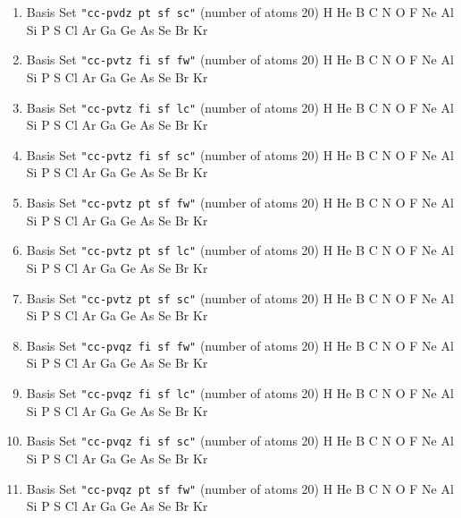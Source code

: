 \begin{enumerate}
\item Basis Set \verb#"cc-pvdz pt sf sc"# (number of atoms 20)  \newline 
  H He B C N O F Ne Al Si P S Cl Ar Ga Ge As Se Br Kr


\item Basis Set \verb#"cc-pvtz fi sf fw"# (number of atoms 20)  \newline 
  H He B C N O F Ne Al Si P S Cl Ar Ga Ge As Se Br Kr


\item Basis Set \verb#"cc-pvtz fi sf lc"# (number of atoms 20)  \newline 
  H He B C N O F Ne Al Si P S Cl Ar Ga Ge As Se Br Kr


\item Basis Set \verb#"cc-pvtz fi sf sc"# (number of atoms 20)  \newline 
  H He B C N O F Ne Al Si P S Cl Ar Ga Ge As Se Br Kr


\item Basis Set \verb#"cc-pvtz pt sf fw"# (number of atoms 20)  \newline 
  H He B C N O F Ne Al Si P S Cl Ar Ga Ge As Se Br Kr


\item Basis Set \verb#"cc-pvtz pt sf lc"# (number of atoms 20)  \newline 
  H He B C N O F Ne Al Si P S Cl Ar Ga Ge As Se Br Kr


\item Basis Set \verb#"cc-pvtz pt sf sc"# (number of atoms 20)  \newline 
  H He B C N O F Ne Al Si P S Cl Ar Ga Ge As Se Br Kr


\item Basis Set \verb#"cc-pvqz fi sf fw"# (number of atoms 20)  \newline 
  H He B C N O F Ne Al Si P S Cl Ar Ga Ge As Se Br Kr


\item Basis Set \verb#"cc-pvqz fi sf lc"# (number of atoms 20)  \newline 
  H He B C N O F Ne Al Si P S Cl Ar Ga Ge As Se Br Kr


\item Basis Set \verb#"cc-pvqz fi sf sc"# (number of atoms 20)  \newline 
  H He B C N O F Ne Al Si P S Cl Ar Ga Ge As Se Br Kr


\item Basis Set \verb#"cc-pvqz pt sf fw"# (number of atoms 20)  \newline 
  H He B C N O F Ne Al Si P S Cl Ar Ga Ge As Se Br Kr



\end{enumerate}
